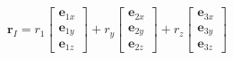 \documentclass[preview]{standalone}
\begin{document}
\begin{align*}
\textbf{r}_I= r_1 \begin{bmatrix}\textbf{e}_{1x}\\\textbf{e}_{1y}\\\textbf{e}_{1z}\end{bmatrix} +r_{\!y} \begin{bmatrix}\textbf{e}_{2x}\\\textbf{e}_{2y}\\\textbf{e}_{2z}\end{bmatrix} +r_{\!z} \begin{bmatrix}\textbf{e}_{3x}\\\textbf{e}_{3y}\\\textbf{e}_{3z}\end{bmatrix}
\end{align*}
\end{document}
